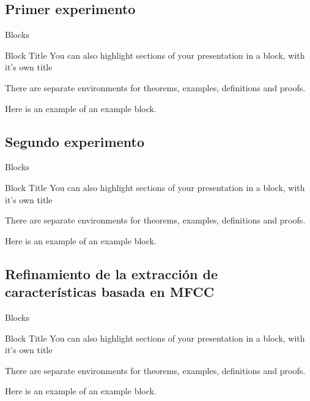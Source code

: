 \documentclass[aspectratio=169]{beamer}
\begin{document}
\subsection{Primer experimento}

\begin{frame}{Blocks}
\begin{block}{Block Title}
You can also highlight sections of your presentation in a block, with it's own title
\end{block}
\begin{theorem}
There are separate environments for theorems, examples, definitions and proofs.
\end{theorem}
\begin{example}
Here is an example of an example block.
\end{example}
\end{frame}

\subsection{Segundo experimento}

\begin{frame}{Blocks}
\begin{block}{Block Title}
You can also highlight sections of your presentation in a block, with it's own title
\end{block}
\begin{theorem}
There are separate environments for theorems, examples, definitions and proofs.
\end{theorem}
\begin{example}
Here is an example of an example block.
\end{example}
\end{frame}

\subsection{Refinamiento de la extracción de características basada en MFCC}

\begin{frame}{Blocks}
\begin{block}{Block Title}
You can also highlight sections of your presentation in a block, with it's own title
\end{block}
\begin{theorem}
There are separate environments for theorems, examples, definitions and proofs.
\end{theorem}
\begin{example}
Here is an example of an example block.
\end{example}
\end{frame}
\end{document}
